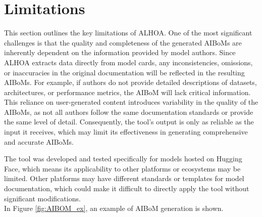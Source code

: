 \documentclass[12pt,a4paper, oneside, openright]{book}
\newcommand{\aibom}{{AIBoM}\xspace}
\newcommand{\aiboms}{{AIBoMs}\xspace}
\begin{document}




\section{Limitations}
This section outlines the key limitations of ALHOA. One of the most significant challenges is that the quality and completeness of the generated \aiboms are inherently dependent on the information provided by model authors. Since ALHOA extracts data directly from model cards, any inconsistencies, omissions, or inaccuracies in the original documentation will be reflected in the resulting \aiboms.
 For example, if authors do not provide detailed descriptions of datasets, architectures, or performance metrics, the \aibom will lack critical information.
This reliance on user-generated content introduces variability in the quality of the \aiboms, as not all authors follow the same documentation standards or provide the same level of detail. Consequently, the tool's output is only as reliable as the input it receives, which may limit its effectiveness in generating comprehensive and accurate \aiboms.

The tool was developed and tested specifically for models hosted on Hugging Face, which means its applicability to other platforms or ecosystems may be limited. Other platforms may have different standards or templates for model documentation, which could make it difficult to directly apply the tool without significant modifications.\\
In Figure \ref{fig:AIBOM_ex}, an example of AIBoM generation is shown.
\end{document}
